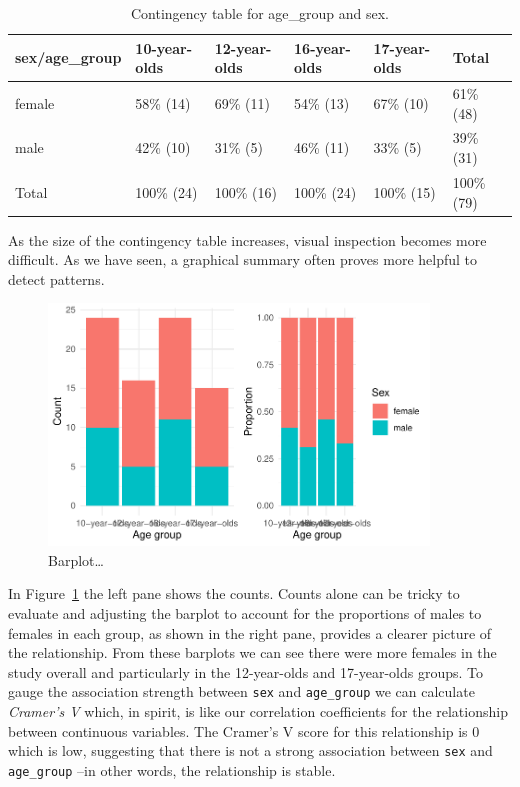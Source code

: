 \documentclass[
  letterpaper,
]{latex/krantz}
\begin{document}
\hypertarget{tbl-summaries-bivariate-categorical-table-belc}{}
\begin{table}
\caption{\label{tbl-summaries-bivariate-categorical-table-belc}Contingency table for age\_group and sex. }\tabularnewline

\centering
\begin{tabular}{llllll}
\toprule
sex/age\_group & 10-year-olds & 12-year-olds & 16-year-olds & 17-year-olds & Total\\
\midrule
female & 58\% (14) & 69\% (11) & 54\% (13) & 67\% (10) & 61\% (48)\\
male & 42\% (10) & 31\%  (5) & 46\% (11) & 33\%  (5) & 39\% (31)\\
Total & 100\% (24) & 100\% (16) & 100\% (24) & 100\% (15) & 100\% (79)\\
\bottomrule
\end{tabular}
\end{table}

As the size of the contingency table increases, visual inspection
becomes more difficult. As we have seen, a graphical summary often
proves more helpful to detect patterns.

\begin{figure}

{\centering \includegraphics[width=0.9\textwidth,height=\textheight]{./approaching-analysis_files/figure-pdf/fig-summaries-bivariate-categorical-barplot-belc-1.pdf}

}

\caption{\label{fig-summaries-bivariate-categorical-barplot-belc}Barplot\ldots{}}

\end{figure}

In Figure~\ref{fig-summaries-bivariate-categorical-barplot-belc} the
left pane shows the counts. Counts alone can be tricky to evaluate and
adjusting the barplot to account for the proportions of males to females
in each group, as shown in the right pane, provides a clearer picture of
the relationship. From these barplots we can see there were more females
in the study overall and particularly in the 12-year-olds and
17-year-olds groups. To gauge the association strength between
\texttt{sex} and \texttt{age\_group} we can calculate \emph{Cramer's V}
which, in spirit, is like our correlation coefficients for the
relationship between continuous variables. The Cramer's V score for this
relationship is 0 which is low, suggesting that there is not a strong
association between \texttt{sex} and \texttt{age\_group} --in other
words, the relationship is stable.
\end{document}
